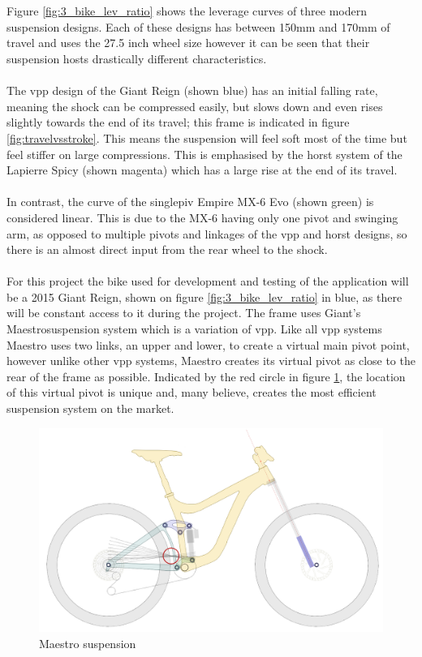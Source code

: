 		\\\\
		Figure \ref{fig:3_bike_lev_ratio} shows the leverage curves of three modern suspension designs. Each of these designs has between 150mm and 170mm of travel and uses the 27.5 inch wheel size however it can be seen that their suspension hosts drastically different characteristics. 
		\\\\
		The \gls{vpp} design of the Giant Reign (shown blue) has an initial falling rate, meaning 
		the \gls{shock} can be compressed easily, but slows down and even rises slightly towards 
		the end of its travel; this frame is indicated in figure \ref{fig:travelvsstroke}. This 
		means the suspension will feel soft most of the time but feel stiffer on large 
		compressions. This is emphasised by the \gls{horst} system of the Lapierre Spicy (shown 
		magenta) which has a large rise at the end of its travel.
		\\\\
		In contrast, the curve of the \gls{singlepiv} Empire MX-6 Evo (shown green) is considered linear. This is due to the MX-6 having only one pivot and swinging arm, as opposed to multiple pivots and linkages of the \gls{vpp} and \gls{horst} designs, so there is an almost direct input from the rear wheel to the \gls{shock}.
		\\\\
		For this project the bike used for development and testing of the application will be a 2015 Giant Reign, shown on figure \ref{fig:3_bike_lev_ratio} in blue, as there will be constant access to it during the project. The frame uses Giant's Maestro\texttrademark  suspension system which is a variation of \gls{vpp}. Like all \gls{vpp} systems Maestro uses two links, an upper and lower, to create a virtual main pivot point, however unlike other \gls{vpp} systems, Maestro creates its virtual pivot as close to the rear of the frame as possible. Indicated by the red circle in figure \ref{fig:maestro}, the location of this virtual pivot is unique and, many believe, creates the most efficient suspension system on the market.
		\begin{figure}[h!]
			\centering
			\includegraphics[width=12cm]{../images/reignsch.PNG}
			\caption{Maestro suspension}
			\label{fig:maestro}
		\end{figure}
